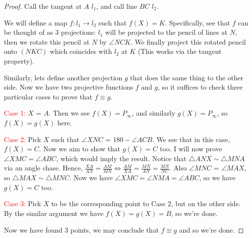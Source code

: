 \documentclass{article}
\theoremstyle{mytheoremstyle}
\theoremstyle{mytheoremstyle}
\theoremstyle{myproblemstyle}
\begin{document}
    \begin{proof}
        Call the tangent at $A$ $l_1$, and call line $BC$ $l_2$. 
        
        We will define a map $f:l_1 \to l_2$ such that $f(X) = K$. Specifically, see that $f$ can be thought of as 3 projections: $l_1$ will be projected to the pencil of lines at $N$, then we rotate this pencil at $N$ by $\angle NCK$. We finally project this rotated pencil onto $(NKC)$ which coincides with $l_2$ at $K$ (This works via the tangent property).

        Similarly, lets define another projection $g$ that does the same thing to the other side. Now we have two projective functions $f$ and $g$, so it suffices to check three particular cases to prove that $f\equiv g$.

        \textcolor{red}{Case 1:} $X$ = $A$. Then we see $f(X) = P_{\infty}$, and similarly $g(X) = P_{\infty}$, so $f(X) = g(X)$ here.
        
        \textcolor{red}{Case 2:} Pick $X$ such that $\angle XNC$ = $180 - \angle ACB$. We see that in this case, $f(X) = C$. Now we aim to show that $g(X) = C$ too. I will now prove $\angle XMC = \angle ABC$, which would imply the result. Notice that $\triangle ANX \sim \triangle MNA$ via an angle chase. Hence, $\frac{XA}{AN} = \frac{AM}{MN} \iff \frac{AM}{XA} = \frac{MN}{AN} = \frac{MN}{NC}$. Also $\angle MNC$ = $\angle MAX$, so $\triangle MAX \sim \triangle MNC$. Now we have $\angle XMC = \angle NMA = \angle ABC$, so we have $g(X) = C$ too.

        \textcolor{red}{Case 3:} Pick $X$ to be the corresponding point to Case 2, but on the other side. By the similar argument we have $f(X) = g(X) = B$, so we're done.

        Now we have found 3 points, we may conclude that $f\equiv g$ and so we're done.
    \end{proof}

    
\end{document}

